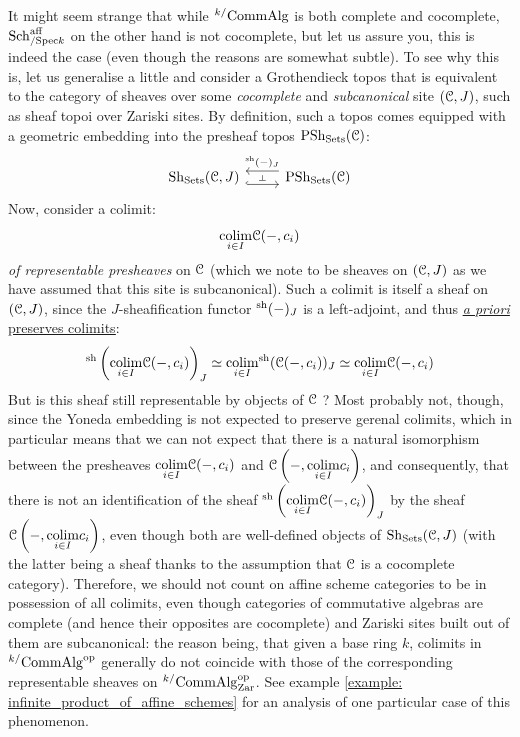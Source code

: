                \begin{remark} \label{remark: affine_scheme_colimits} 
                It might seem strange that while ${}^{k/}\mathrm{Comm}\mathrm{Alg}$ is both complete and cocomplete, $\mathrm{Sch}^{\mathrm{aff}}_{/\mathrm{Spec} k}$ on the other hand is not cocomplete, but let us assure you, this is indeed the case (even though the reasons are somewhat subtle). To see why this is, let us generalise a little and consider a Grothendieck topos that is equivalent to the category of sheaves over some \textit{cocomplete} and \textit{subcanonical} site $(\mathcal{C}, J)$, such as sheaf topoi over Zariski sites. By definition, such a topos comes equipped with a geometric embedding into the presheaf topos $\mathrm{PSh}_{\mathrm{Sets}}(\mathcal{C})$:
                    $$
                        \begin{tikzcd}
                        	\Sh_{\Sets}(\C, J) & {\Psh_{\Sets}(\C)}
                        	\arrow[""{name=0, anchor=center, inner sep=0}, shift right=2, hook, from=1-1, to=1-2]
                        	\arrow[""{name=1, anchor=center, inner sep=0}, "{}^{\sh}(-)_J"', shift right=2, from=1-2, to=1-1]
                        	\arrow["\dashv"{anchor=center, rotate=-90}, draw=none, from=1, to=0]
                        \end{tikzcd}
                    $$
                Now, consider a colimit:
                    $$\underset{i \in I}{\operatorname{colim}} \mathcal{C}(-, c_i)$$
                \textit{of representable presheaves} on $\mathcal{C}$ (which we note to be sheaves on $(\mathcal{C}, J)$ as we have assumed that this site is subcanonical). Such a colimit is itself a sheaf on $(\mathcal{C}, J)$, since the $J$-sheafification functor ${}^{\mathrm{sh}}(-)_J$ is a left-adjoint, and thus \href{https://ncatlab.org/nlab/show/adjoints+preserve+\%28co-\%29limits}{\underline{\textit{a priori} preserves colimits}}:
                    $${}^{\mathrm{sh}}\left(\underset{i \in I}{\operatorname{colim}} \mathcal{C}(-, c_i)\right)_J \simeq \underset{i \in I}{\operatorname{colim}} {}^{\mathrm{sh}}(\mathcal{C}(-, c_i))_J \simeq \underset{i \in I}{\operatorname{colim}} \mathcal{C}(-, c_i)$$
                But is this sheaf still representable by objects of $\mathcal{C}$ ? Most probably not, though, since the Yoneda embedding is not expected to preserve gerenal colimits, which in particular means that we can not expect that there is a natural isomorphism between the presheaves $\underset{i \in I}{\operatorname{colim}} \mathcal{C}(-, c_i)$ and $\mathcal{C}\left(-, \underset{i \in I}{\operatorname{colim}} c_i\right)$, and consequently, that there is not an identification of the sheaf ${}^{\mathrm{sh}}\left(\underset{i \in I}{\operatorname{colim}} \mathcal{C}(-, c_i)\right)_J$ by the sheaf $\mathcal{C}\left(-, \underset{i \in I}{\operatorname{colim}} c_i\right)$, even though both are well-defined objects of $\mathrm{Sh}_{\mathrm{Sets}}(\mathcal{C}, J)$ (with the latter being a sheaf thanks to the assumption that $\mathcal{C}$ is a cocomplete category). Therefore, we should not count on affine scheme categories to be in possession of all colimits, even though categories of commutative algebras are complete (and hence their opposites are cocomplete) and Zariski sites built out of them are subcanonical: the reason being, that given a base ring $k$, colimits in ${}^{k/}\mathrm{Comm}\mathrm{Alg}^{\mathrm{op}}$ generally do not coincide with those of the corresponding representable sheaves on ${}^{k/}\mathrm{Comm}\mathrm{Alg}^{\mathrm{op}}_{\mathrm{Zar}}$. See example \ref{example: infinite_product_of_affine_schemes} for an analysis of one particular case of this phenomenon.

\end{remark}
